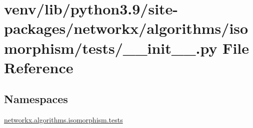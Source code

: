 \hypertarget{venv_2lib_2python3_89_2site-packages_2networkx_2algorithms_2isomorphism_2tests_2____init_____8py}{}\section{venv/lib/python3.9/site-\/packages/networkx/algorithms/isomorphism/tests/\+\_\+\+\_\+init\+\_\+\+\_\+.py File Reference}
\label{venv_2lib_2python3_89_2site-packages_2networkx_2algorithms_2isomorphism_2tests_2____init_____8py}
\subsection*{Namespaces}
\begin{DoxyCompactItemize}
\item 
 \hyperlink{namespacenetworkx_1_1algorithms_1_1isomorphism_1_1tests}{networkx.\+algorithms.\+isomorphism.\+tests}
\end{DoxyCompactItemize}

